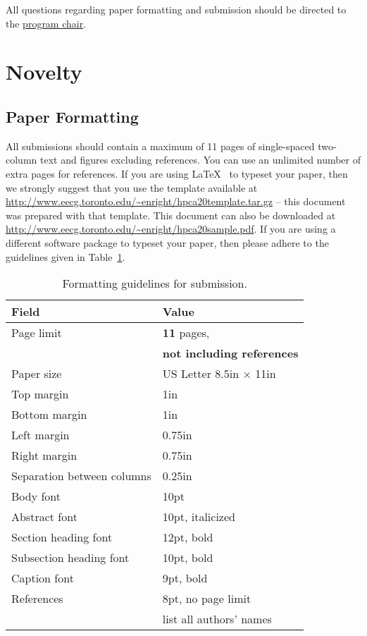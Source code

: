 \documentclass[pageno]{jpaper}
\begin{document}
All questions regarding paper formatting and submission should be directed to
the \href{mailto:enright@eecg.toronto.edu}{program chair}.

\section{Novelty}

\subsection{Paper Formatting}

All submissions should contain a maximum of 11 pages of single-spaced
two-column text and figures excluding references. You can use an unlimited number of extra pages for references. 
If you are using \LaTeX~\cite{lamport94} 
to typeset your paper, then we 
strongly suggest
that you use the template available at
\url{http://www.eecg.toronto.edu/~enright/hpca20template.tar.gz} -- this
document was prepared with that template.  This document can
also be downloaded at \url{http://www.eecg.toronto.edu/~enright/hpca20sample.pdf}.
If you are using a different
software package to typeset your paper, then please adhere to the guidelines
given in Table~\ref{table:formatting}.

\begin{table}[h!]
  \centering
  \begin{tabular}{|l|l|}
    \hline
    \textbf{Field} & \textbf{Value}\\
    \hline
    \hline
    Page limit & {\bf 11} pages, \\
& {\bf not including references}\\
    \hline
    Paper size & US Letter 8.5in $\times$ 11in\\
    \hline
    Top margin & 1in\\
    \hline
    Bottom margin & 1in\\
    \hline
    Left margin & 0.75in\\
    \hline
    Right margin & 0.75in\\
    \hline
    Separation between columns & 0.25in\\
    \hline
    Body font & 10pt\\
    \hline
    Abstract font & 10pt, italicized\\
    \hline
    Section heading font & 12pt, bold\\
    \hline
    Subsection heading font & 10pt, bold\\
    \hline
    Caption font & 9pt, bold\\
    \hline
    References & 8pt, no page limit\\
& list all authors' names \\
    \hline
  \end{tabular}
  \caption{Formatting guidelines for submission.}
  \label{table:formatting}
\end{table}
\end{document}
